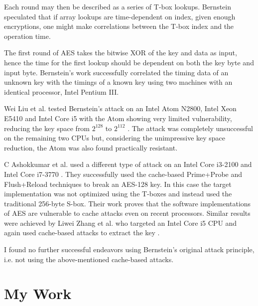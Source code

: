 \documentclass{article}
\begin{document}
Each round may then be described as a series of T-box lookups.
Bernstein speculated that if array lookups are time-dependent on index, \cite[p. 3]{bernstein2005cache} given enough encryptions, one might make correlations between the T-box index and the operation time.

The first round of AES takes the bitwise XOR of the key and data as input, hence the time for the first lookup should be dependent on both the key byte and input byte.
Bernstein's work successfully correlated the timing data of an unknown key with the timings of a known key using two machines with an identical processor, Intel Pentium III.

Wei Liu et al. tested Bernstein's attack on an Intel Atom N2800, Intel Xeon E5410 and Intel Core i5 with the Atom showing very limited vulnerability, reducing the key space from $2^{128}$ to $2^{112}$ \cite{WEI} .
The attack was completely unsuccessful on the remaining two CPUs but, considering the unimpressive key space reduction, the Atom was also found practically resistant.

C Ashokkumar et al. used a different type of attack on an Intel Core i3-2100 and Intel Core i7-3770 \cite{ASHOKKUMAR}.
They successfully used the cache-based Prime+Probe and Flush+Reload techniques to break an AES-128 key.
In this case the target implementation was not optimized using the T-boxes and instead used the traditional 256-byte S-box.
Their work proves that the software implementations of AES are vulnerable to cache attacks even on recent processors.
Similar results were achieved by Liwei Zhang et al. who targeted an Intel Core i5 CPU and again used cache-based attacks to extract the key \cite{ZHANG}.

I found no further successful endeavors using Bernstein's original attack principle, i.e. not using the above-mentioned cache-based attacks.


\section{My Work}
\end{document}
